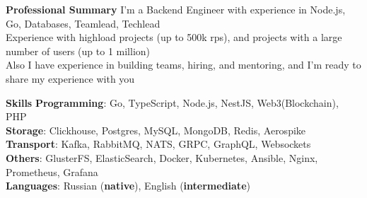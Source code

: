 \documentclass{resume}
\begin{document}

\begin{rSection}{\textbf{Professional Summary}}
{
    I'm a Backend Engineer with experience in Node.js, Go, Databases, Teamlead, Techlead
 \\   Experience with highload projects (up to 500k rps), and projects with a large number of users (up to 1 million)
  \\  Also I have experience in building teams, hiring, and mentoring, and I'm ready to share my experience with you
}

\end{rSection}
\begin{rSection}{\textbf{Skills}}
    \textbf{Programming}: Go, TypeScript, Node.js, NestJS, Web3(Blockchain), PHP
    \\ \textbf{Storage}: Clickhouse, Postgres, MySQL, MongoDB, Redis, Aerospike
    \\ \textbf{Transport}: Kafka, RabbitMQ, NATS, GRPC, GraphQL, Websockets
    \\ \textbf{Others}: GlusterFS, ElasticSearch, Docker, Kubernetes, Ansible, Nginx, Prometheus, Grafana
    \\ \textbf{Languages}: Russian ({\textbf{native}}), English ({\textbf{intermediate}})
\end{rSection}
\end{document}
